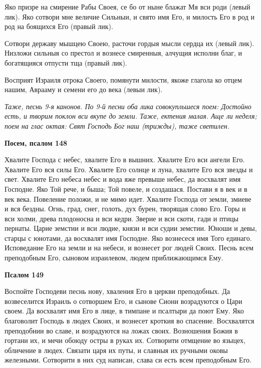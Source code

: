 Яко призре на смирение Рабы Своея, се бо от ныне блажат Мя вси роди (левый лик). Яко сотвори мне величие Сильныи, и свято имя Его, и милость Его в род и род на боящихся Его (правый лик).


Сотвори державу мышцею Своею, расточи гордыя мысли сердца их (левый лик). Низложи сильныя со престол и вознесе смиренныя, алчущия исполни благ, и богатящияся отпусти тща (правый лик).


Восприят Израиля отрока Своего, помянути милости, якоже глагола ко отцем нашим, Аврааму и семени его до века (левыи лик).


\itshape Таже, песнь 9-я канонов. По 9-й песни оба лика совокупльшеся поем:\normalfont{} Достойно есть, и творим поклон вси вкупе до земли. Таже, ектения малая. Аще ли неделя; поем на глас октая: Свят Господь Бог наш \itshape (трижды)\normalfont{}, таже светилен.





\bfseries Посем, псалом 148\normalfont{}


Хвалите Господа с небес, хвалите Его в вышних. Хвалите Его вси ангели Его. Хвалите Его вся силы Его. Хвалите Его солнце и луна, хвалите Его вся звезды и свет. Хвалите Его небеса небес и вода яже превыше небес, да восхвалят имя Господне. Яко Той рече, и быша; Той повеле, и создашася. Постави я в век и в век века. Повеление положи, и не мимо идет. Хвалите Господа от земли, змиеве и вся бездны. Огнь, град, снег, голоть, дух бурен, творящая слово Его. Горы и вси холми, древа плодоносна и вси кедри. Зверие и вси скоти, гади и птицы пернаты. Царие земстии и вси людие, князи и вси судии земстии. Юноши и девы, старцы с юнотами, да восхвалят имя Господне. Яко вознесеся имя Того единаго. Исповедание Его на земли и на небеси, и вознесет рог людей Своих. Песнь всем преподобным Его, сыновом израилевом, людем приближающимся Ему.





\bfseries Псалом 149\normalfont{}


Воспойте Господеви песнь нову, хваления Его в церкви преподобных. Да возвеселится Израиль о сотворшем Его, и сынове Сиони возрадуются о Цари своем. Да восхвалят имя Его в лице, в тимпане и псалтыри да поют Ему. Яко благоволит Господь в людех Своих, и вознесет кроткия во спасение. Восхвалятся преподобнии во славе, и возрадуются на ложах своих. Возношения Божия в гортани их, и мечи обоюду остры в руках их. Сотворити отмщение во языцех, обличение в людех. Связати царя их путы, и славныя их ручными оковы железными. Сотворити в них суд написан, слава си есть всем преподобным Его.





